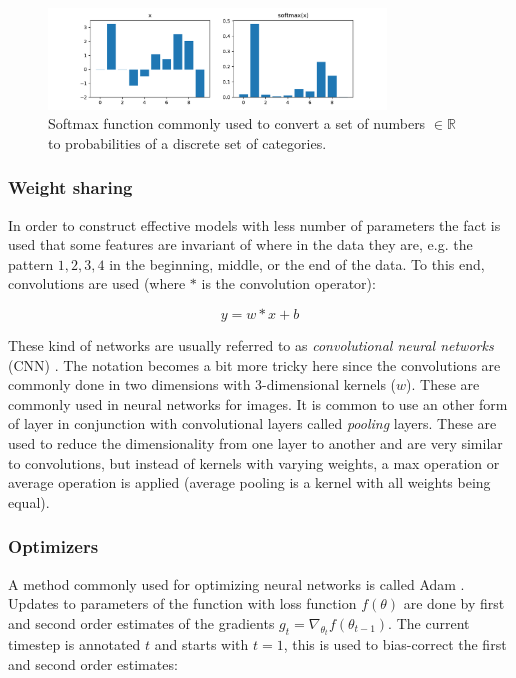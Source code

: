 \begin{figure}[h]
    \centering
    \includegraphics[width=0.8\textwidth]{res/softmax.pdf}

    \caption{Softmax function commonly used to convert a set of numbers $\in \mathbb{R}$ to probabilities of a discrete set of categories.}

    \label{fig:softmax}
\end{figure}

\subsubsection{Weight sharing}

In order to construct effective models with less number of parameters the fact
is used that some features are invariant of where in the data they are, e.g.
the pattern $1, 2, 3, 4$ in the beginning, middle, or the end of the data. To
this end, convolutions are used (where $*$ is the convolution operator):

\begin{equation}
    y = w * x + b
\end{equation}

These kind of networks are usually referred to as \textit{convolutional neural
networks} (CNN) \cite{lecun1989backpropagation}. The notation becomes a bit
more tricky here since the convolutions are commonly done in two dimensions
with 3-dimensional kernels ($w$). These are commonly used in neural networks
for images. It is common to use an other form of layer in conjunction with
convolutional layers called \textit{pooling} layers. These are used to reduce
the dimensionality from one layer to another and are very similar to
convolutions, but instead of kernels with varying weights, a max operation
\cite{huang2007unsupervised} or average operation \cite{lecun1998gradient} is
applied (average pooling is a kernel with all weights being equal).

\subsubsection{Optimizers}

A method commonly used for optimizing neural networks is called Adam
\cite{kingma2014adam}. Updates to parameters of the function with loss
function $f(\theta)$ are done by first and second order estimates of the
gradients $g_t = \nabla_{\theta_t} f(\theta_{t-1})$. The current timestep is
annotated $t$ and starts with $t = 1$, this is used to bias-correct
the first and second order estimates:

